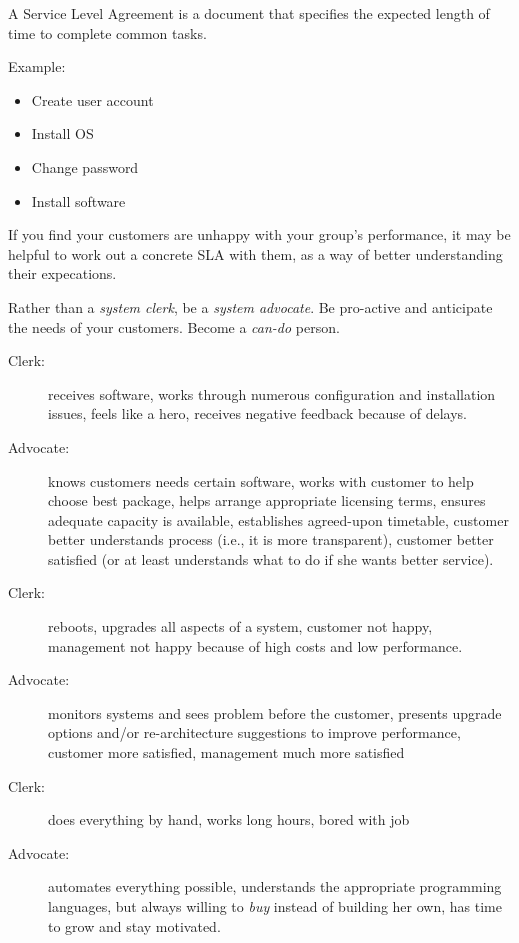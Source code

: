 \documentclass{slides}
\newcommand{\bi}{\begin{itemize}}
\newcommand{\ei}{\end{itemize}}
\newcommand{\bd}{\begin{description}}
\newcommand{\ed}{\end{description}}
\begin{document}
A Service Level Agreement is a document that specifies the 
expected length of time to complete common tasks.

Example:

\bi
\item Create user account
\item Install OS
\item Change password
\item Install software
\ei


If you find your customers are unhappy with your group's performance, it
may be helpful to work out a concrete SLA with them, as a way of
better understanding their expecations.


Rather than a \emph{system clerk}, be a \emph{system advocate}.  Be
pro-active and anticipate the needs of your customers.  Become a
\emph{can-do} person.


\bd
\item[Clerk:] receives software, works through numerous configuration and 
  installation issues, feels like a hero, receives negative feedback 
  because of delays.
\item[Advocate:] knows customers needs certain software, works with 
  customer to help choose best package, helps arrange appropriate licensing
  terms, ensures adequate capacity is available, establishes agreed-upon
  timetable, customer better understands process (i.e., it is more
  transparent), customer better satisfied (or at least understands what
  to do if she wants better service).
\ed


\bd
\item[Clerk:] reboots, upgrades all aspects of a system, customer not
  happy, management not happy because of high costs and low performance.
\item[Advocate:] monitors systems and sees problem before the customer,
  presents upgrade options and/or re-architecture suggestions to improve
  performance, customer more satisfied, management much more satisfied
\ed


\bd
\item[Clerk:] does everything by hand, works long hours, bored with job
\item[Advocate:] automates everything possible, understands the appropriate
  programming languages, but always willing to \emph{buy} instead of
  building her own, has time to grow and stay motivated.
\ed
\end{document}
